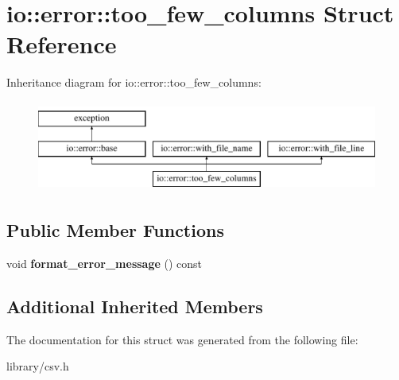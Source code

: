 \hypertarget{structio_1_1error_1_1too__few__columns}{}\section{io\+:\+:error\+:\+:too\+\_\+few\+\_\+columns Struct Reference}
\label{structio_1_1error_1_1too__few__columns}
Inheritance diagram for io\+:\+:error\+:\+:too\+\_\+few\+\_\+columns\+:\begin{figure}[H]
\begin{center}
\leavevmode
\includegraphics[height=3.000000cm]{structio_1_1error_1_1too__few__columns}
\end{center}
\end{figure}
\subsection*{Public Member Functions}
\begin{DoxyCompactItemize}
\item 
\mbox{\label{structio_1_1error_1_1too__few__columns_a58d6d1fada127120facbcc00851ab455}} 
void {\bfseries format\+\_\+error\+\_\+message} () const
\end{DoxyCompactItemize}
\subsection*{Additional Inherited Members}


The documentation for this struct was generated from the following file\+:\begin{DoxyCompactItemize}
\item 
library/csv.\+h\end{DoxyCompactItemize}
